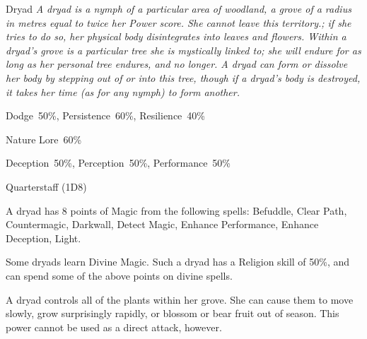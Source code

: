 \begin{monsterbox}{Dryad}
	\textit{A dryad is a nymph of a particular area of woodland, a grove of a radius in metres equal to twice her Power score. She cannot leave this territory.; if she tries to do so, her physical body disintegrates into leaves and flowers. Within a dryad’s grove is a particular tree she is mystically linked to; she will endure for as long as her personal tree endures, and no longer. A dryad can form or dissolve her body by stepping out of or into this tree, though if a dryad’s body is destroyed, it takes her time (as for any nymph) to form another.}\\
	\rpghline
	\basics[%
        hitpoints  = 11, 
	majorwound = 6,
	damagemodifier = 0,
	powerpoints = 22,
	movementrate = 15m,
	armor = None,
	plunderrating = 1
	]
	\rpghline%
	\stats[ %
		STR = 2D6    (7),
		CON = 3D6    (11),
		DEX = 4D6    (14),
		SIZ = 2D6+3  (10),
		INT = 3D6+6  (17),
		POW = 2D6+15 (22),
		CHA = 2D6+12 (19)
	]
	\rpghline%
	\begin{rpg-monsteraction}[Resistances]
		Dodge~50\%, Persistence~60\%, Resilience~40\%
	\end{rpg-monsteraction}
	\begin{rpg-monsteraction}[Knowledge]
		Nature Lore~60\%
	\end{rpg-monsteraction}
	\begin{rpg-monsteraction}[Practical]
		Deception~50\%, Perception~50\%, Performance~50\%
	\end{rpg-monsteraction}
	\begin{rpg-monsteraction}
		Quarterstaff (1D8)
	\end{rpg-monsteraction}
	\begin{rpg-monsteraction}[Magic 60\%]
		A dryad has 8 points of Magic from the following spells: Befuddle, Clear Path, Countermagic, Darkwall, Detect Magic, Enhance Performance, Enhance Deception, Light.
	\end{rpg-monsteraction}
	\begin{rpg-monsteraction}
		Some dryads learn Divine Magic. Such a dryad has a Religion skill of 50\%, and can spend some of the above points on divine spells. 
	\end{rpg-monsteraction}
	\begin{rpg-monsteraction}
		A dryad controls all of the plants within her grove. She can cause them to move slowly, grow surprisingly rapidly, or blossom or bear fruit out of season. This power cannot be used as a direct attack, however.
	\end{rpg-monsteraction}

\end{monsterbox}

